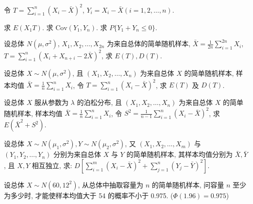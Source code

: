 \documentclass[padp]{ExBook}
\begin{document}
\begin{qitems}
\begin{bbox}
令 $T = \sum_{i=1}^{n}(X_i - \bar{X})^2$, $Y_i = X_i - \bar{X} (i=1, 2, \dots, n)$.
\begin{subqitems}
         \subqitem 求 $E(X_1 T)$.
         \subqitem 求 $\text{Cov}(Y_1, Y_n)$.
         \subqitem 求 $P\{Y_1+Y_n \le 0\}$.
 \end{subqitems}
    \end{bbox}
    \begin{bbox}
        \qitem  设总体 $N(\mu, \sigma^2)$, $X_1, X_2, \dots, X_{2n}$ 为来自总体的简单随机样本, $\bar{X} = \frac{1}{2n}\sum_{i=1}^{2n}X_i$,
$T = \sum_{i=1}^{n}(X_i + X_{n+i} - 2\bar{X})^2$, 求 $E(T), D(T)$.
    \end{bbox}
    \begin{bbox}
        \qitem 设总体 $X \sim N(\mu, \sigma^2)$, 且 $(X_1, X_2, \dots, X_n)$ 为来自总体 $X$ 的简单随机样本, 样本均值 $\bar{X} = \frac{1}{n}\sum_{i=1}^{n}X_i$, 令 $T = \sum_{i=1}^{n}(X_i - \bar{X})^2$, 求 $E(T)$ 及 $D(T)$.
    \end{bbox}
    \begin{bbox}
        \qitem 设总体 $X$ 服从参数为 $\lambda$ 的泊松分布, 且 $(X_1, X_2, \dots, X_n)$ 为来自总体 $X$ 的简单随机样本, 样本均值 $\bar{X} = \frac{1}{n}\sum_{i=1}^{n}X_i$, 令 $S^2 = \frac{1}{n-1}\sum_{i=1}^{n}(X_i - \bar{X})^2$, 求 $E(\bar{X}^2+S^2)$.
    \end{bbox}
    \begin{bbox}
        \qitem 设总体 $X \sim N(\mu_1, \sigma^2), Y \sim N(\mu_2, \sigma^2)$, 又 $(X_1, X_2, \dots, X_m)$ 与 $(Y_1, Y_2, \dots, Y_n)$ 分别为来自总体 $X$ 与 $Y$ 的简单随机样本, 其样本均值分别为 $\bar{X}, \bar{Y}$, 且 $X, Y$ 相互独立, 求:
$D\left[\sum_{i=1}^{m}(X_i - \bar{X})^2 + \sum_{j=1}^{n}(Y_j - \bar{Y})^2\right]$.
    \end{bbox}
    \begin{bbox}
        \qitem 设总体 $X \sim N(60, 12^2)$, 从总体中抽取容量为 $n$ 的简单随机样本, 问容量 $n$ 至少为多少时, 才能使样本均值大于 54 的概率不小于 0.975. ($\Phi(1.96)=0.975$)
    \end{bbox}
\end{qitems}
\end{document}
